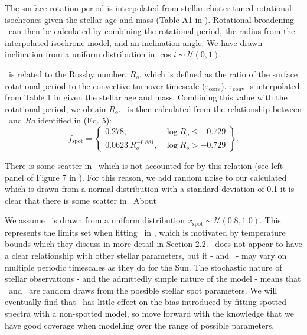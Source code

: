 The surface rotation period is interpolated from stellar cluster-tuned rotational isochrones given the stellar age and mass (Table A1 in \citet{spada_angular_2016}). Rotational broadening \vsini\ can then be calculated by combining the rotational period, the radius from the interpolated isochrone model, and an inclination angle. We have drawn inclination from a uniform distribution in $\cos{i} \sim \mathcal{U}(0, 1)$.

\fspot\ is related to the Rossby number, $R_o$, which is defined as the ratio of the surface rotational period to the convective turnover timescale ($\tau_{\textrm{conv}}$). $\tau_{\textrm{conv}}$ is interpolated from Table 1 in \citet{landin_theoretical_2010} given the stellar age and mass. Combining this value with the rotational period, we obtain $R_o$. \fspot\ is then calculated from the relationship between \fspot\ and $Ro$ identified in \citet{cao_starspots_2022} (Eq. 5):
\begin{equation}
f_{\text{spot}} = 
\left\{
    \begin{array}{lr}
        0.278, & \log{R_o} \leq -0.729 \\
        0.0623\ R_o^{-0.881}, & \log{R_o} > -0.729
    \end{array}
\right\}.
\end{equation}



There is some scatter in \fspot\, which is not accounted for by this relation (see left panel of Figure 7 in \citet{cao_starspots_2022}). For this reason, we add random noise to our calculated \fspot\, which is drawn from a normal distribution with a standard deviation of 0.1
it is clear that there is some scatter in \fspot\ About 

We assume \xspot\ is drawn from a uniform distribution $x_{\text{spot}} \sim \mathcal{U}(0.8, 1.0)$. This represents the limits set when fitting \xspot\ in \citep{cao_starspots_2022}, which is motivated by temperature bounds which they discuss in more detail in Section 2.2. \xspot\ does not appear to have a clear relationship with other stellar parameters, but it - and \fspot\ - may vary on multiple periodic timescales as they do for the Sun. The stochastic nature of stellar observations - and the admittedly simple nature of the model - means that \fspot\ and \xspot\ are random draws from the possible stellar spot parameters. We will eventually find that \xspot\ has little effect on the bias introduced by fitting spotted spectra with a non-spotted model, so move forward with the knowledge that we have good coverage when modelling over the range of possible parameters.

